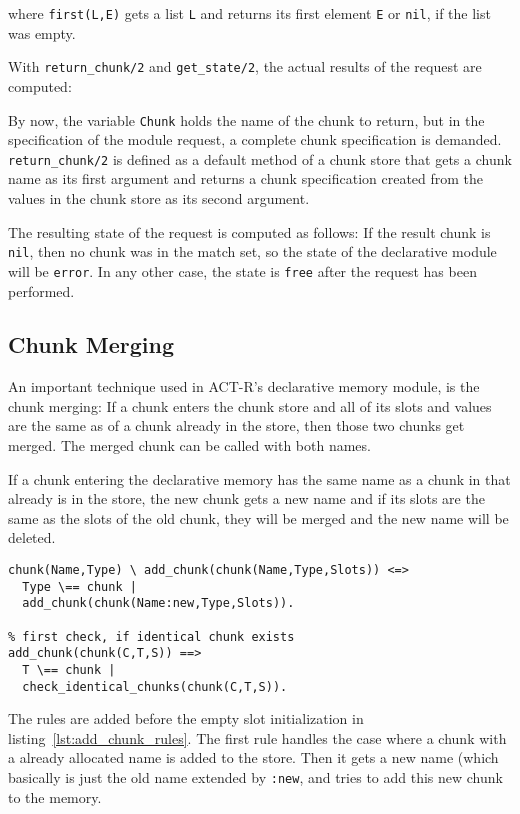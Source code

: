 where \verb|first(L,E)| gets a list \verb|L| and returns its first element \verb|E| or \verb|nil|, if the list was empty.

With \verb|return_chunk/2| and \verb|get_state/2|, the actual results of the request are computed:

By now, the variable \verb|Chunk| holds the name of the chunk to return, but in the specification of the module request, a complete chunk specification is demanded. \verb|return_chunk/2| is defined as a default method of a chunk store that gets a chunk name as its first argument and returns a chunk specification created from the values in the chunk store as its second argument.

The resulting state of the request is computed as follows: If the result chunk is \verb|nil|, then no chunk was in the match set, so the state of the declarative module will be \verb|error|. In any other case, the state is \verb|free| after the request has been performed.

\subsection{Chunk Merging}

An important technique used in ACT-R's declarative memory module, is the chunk merging: If a chunk enters the chunk store and all of its slots and values are the same as of a chunk already in the store, then those two chunks get merged. The merged chunk can be called with both names.

If a chunk entering the declarative memory has the same name as a chunk in that already is in the store, the new chunk gets a new name and if its slots are the same as the slots of the old chunk, they will be merged and the new name will be deleted.

\begin{lstlisting}
chunk(Name,Type) \ add_chunk(chunk(Name,Type,Slots)) <=>
  Type \== chunk |
  add_chunk(chunk(Name:new,Type,Slots)).

% first check, if identical chunk exists
add_chunk(chunk(C,T,S)) ==> 
  T \== chunk | 
  check_identical_chunks(chunk(C,T,S)).
\end{lstlisting}

The rules are added before the empty slot initialization in listing~\ref{lst:add_chunk_rules}. The first rule handles the case where a chunk with a already allocated name is added to the store. Then it gets a new name (which basically is just the old name extended by \verb|:new|, and tries to add this new chunk to the memory. 

